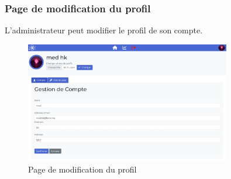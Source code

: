 \documentclass{article}
\begin{document}
                    \subsubsection{Page de modification du profil}
                        L'administrateur peut modifier le profil de son compte.
                        \begin{figure}[h!]
                            \centering
                            \includegraphics[width=0.8\textwidth]{assets/webSite/AdminModif.jpeg}
                            \caption{Page de modification du profil}
                        \end{figure}
                        \FloatBarrier
                        \newpage
\end{document}
